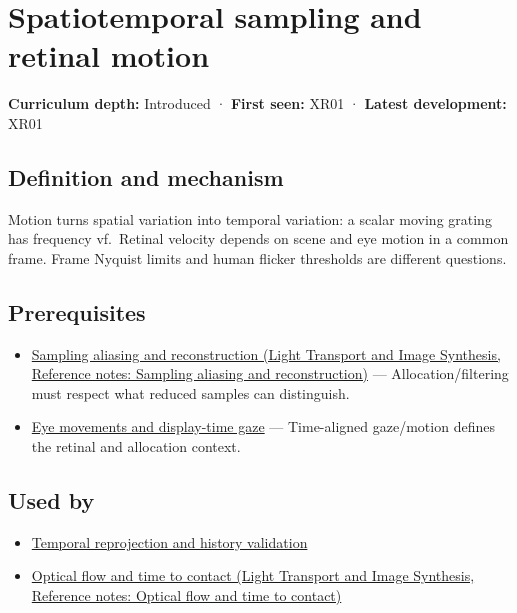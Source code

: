 \hypertarget{appendix-70895739febb}{}\label{referencestart:appendix-70895739febb}
\section{Spatiotemporal sampling and retinal motion}\label{appendix-70895739febb-spatiotemporal-sampling-and-retinal-motion}

\textbf{Curriculum depth:} Introduced · \textbf{First seen:} XR01 · \textbf{Latest development:} XR01

\begin{allmightroledefinition}

\subsection{Definition and mechanism}\label{appendix-70895739febb-definition-and-mechanism}

Motion turns spatial variation into temporal variation: a scalar moving grating has frequency \textbar v\textbar f.~Retinal velocity depends on scene and eye motion in a common frame. Frame Nyquist limits and human flicker thresholds are different questions.

\end{allmightroledefinition}

\subsection{Prerequisites}\label{appendix-70895739febb-prerequisites}

\begin{itemize}
\tightlist
\item
  \href{../04-Light-Transport-and-Image-Synthesis/main.pdf\#nameddest=appendix-6a7869dd79a6}{Sampling aliasing and reconstruction (Light Transport and Image Synthesis, Reference notes: Sampling aliasing and reconstruction)} --- Allocation/filtering must respect what reduced samples can distinguish.
\item
  \hyperref[appendix-a6f2c4fe1996]{Eye movements and display-time gaze} --- Time-aligned gaze/motion defines the retinal and allocation context.
\end{itemize}

\subsection{Used by}\label{appendix-70895739febb-used-by}

\begin{itemize}
\tightlist
\item
  \hyperref[appendix-0727340a4428]{Temporal reprojection and history validation}
\item
  \href{../04-Light-Transport-and-Image-Synthesis/main.pdf\#nameddest=appendix-e2e73f8cd93e}{Optical flow and time to contact (Light Transport and Image Synthesis, Reference notes: Optical flow and time to contact)}
\end{itemize}


